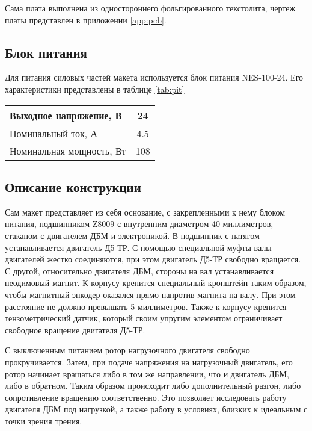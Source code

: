 Сама плата выполнена из одностороннего фольгированного текстолита, чертеж платы представлен
в приложении \ref{app:pcb}.

\subsection{Блок питания}

Для питания силовых частей макета используется блок питания NES-100-24. Его характеристики представлены в таблице \ref{tab:pit}

\begin{tabularx}{\textwidth}{|X|c|}
  \caption{Характеристики блока питания}\label{tab:pit}\\
  \hline
    Выходное напряжение, В & 24 \\
  \hline
    Номинальный ток, А & 4.5 \\
  \hline
    Номинальная мощность, Вт & 108 \\
  \hline
\end{tabularx}

\subsection{Описание конструкции}

Сам макет представляет из себя основание, с закрепленными к нему блоком питания, подшипником Z8009 
с внутренним диаметром 40 миллиметров, стаканом с двигателем ДБМ и электроникой. 
В подшипник с натягом устанавливается двигатель Д5-ТР. С помощью специальной муфты валы двигателей
жестко соединяются, при этом двигатель Д5-ТР свободно вращается. С другой, относительно двигателя ДБМ,
стороны на вал устанавливается неодимовый магнит. К корпусу крепится специальный кронштейн таким 
образом, чтобы магнитный энкодер оказался прямо напротив магнита на валу. При этом расстояние не должно
превышать 5 миллиметров. Также к корпусу крепится тензометрический
датчик, который своим упругим элементом ограничивает свободное вращение двигателя Д5-ТР.

С выключенным питанием ротор нагрузочного двигателя свободно прокручивается. Затем, при подаче
напряжения на нагрузочный двигатель, его ротор начинает вращаться либо в том же направлении, что и 
двигатель ДБМ, либо в обратном. Таким образом происходит либо дополнительный разгон, либо 
сопротивление вращению соответственно. Это позволяет исследовать работу двигателя ДБМ под нагрузкой,
а также работу в условиях, близких к идеальным с точки зрения трения.

